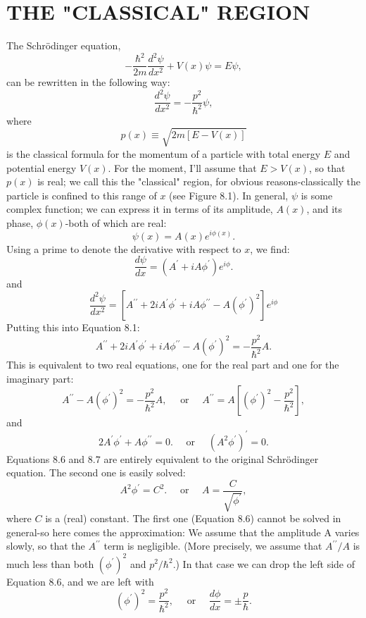 \documentclass[main.tex]{subfiles}
\begin{document}
\section{THE "CLASSICAL" REGION}
The Schrödinger equation,
$$
-\frac{\hbar^2}{2 m} \frac{d^2 \psi}{d x^2}+V(x) \psi=E \psi,
$$
can be rewritten in the following way:
$$
\frac{d^2 \psi}{d x^2}=-\frac{p^2}{\hbar^2} \psi,
$$
where
$$
p(x) \equiv \sqrt{2 m[E-V(x)]}
$$
is the classical formula for the momentum of a particle with total energy $E$ and potential energy $V(x)$. For the moment, I'll assume that $E>V(x)$, so that $p(x)$ is real; we call this the "classical" region, for obvious reasons-classically the particle is confined to this range of $x$ (see Figure 8.1). In general, $\psi$ is some complex function; we can express it in terms of its amplitude, $A(x)$, and its phase, $\phi(x)$-both of which are real:
$$
\psi(x)=A(x) e^{i \phi(x)} .
$$
Using a prime to denote the derivative with respect to $x$, we find:
$$
\frac{d \psi}{d x}=\left(A^{\prime}+i A \phi^{\prime}\right) e^{i \phi} .
$$
and
$$
\frac{d^2 \psi}{d x^2}=\left[A^{\prime \prime}+2 i A^{\prime} \phi^{\prime}+i A \phi^{\prime \prime}-A\left(\phi^{\prime}\right)^2\right] e^{i \phi}
$$
Putting this into Equation 8.1:
$$
A^{\prime \prime}+2 i A^{\prime} \phi^{\prime}+i A \phi^{\prime \prime}-A\left(\phi^{\prime}\right)^2=-\frac{p^2}{\hbar^2} A .
$$
This is equivalent to two real equations, one for the real part and one for the imaginary part:
$$
A^{\prime \prime}-A\left(\phi^{\prime}\right)^2=-\frac{p^2}{\hbar^2} A, \quad \text { or } \quad A^{\prime \prime}=A\left[\left(\phi^{\prime}\right)^2-\frac{p^2}{\hbar^2}\right],
$$
and
$$
2 A^{\prime} \phi^{\prime}+A \phi^{\prime \prime}=0 . \quad \text { or } \quad\left(A^2 \phi^{\prime}\right)^{\prime}=0 .
$$
Equations $8.6$ and $8.7$ are entirely equivalent to the original Schrödinger equation. The second one is easily solved:
$$
A^2 \phi^{\prime}=C^2 . \quad \text { or } \quad A=\frac{C}{\sqrt{\phi^{\prime}}},
$$
where $C$ is a (real) constant. The first one (Equation 8.6) cannot be solved in general-so here comes the approximation: We assume that the amplitude A varies slowly, so that the $A^{\prime \prime}$ term is negligible. (More precisely, we assume that $A^{\prime \prime} / A$ is much less than both $\left(\phi^{\prime}\right)^2$ and $p^2 / \hbar^2$.) In that case we can drop the left side of Equation 8.6, and we are left with
$$
\left(\phi^{\prime}\right)^2=\frac{p^2}{\hbar^2}, \quad \text { or } \quad \frac{d \phi}{d x}=\pm \frac{p}{\hbar} .
$$
\end{document}
